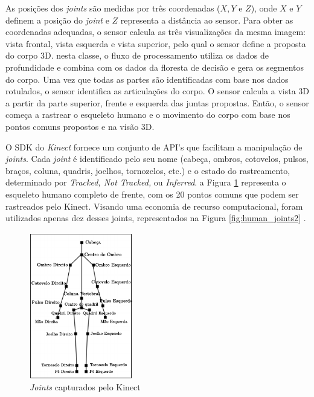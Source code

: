 As posições dos \textit{joints} são medidas por três coordenadas ($X, Y$ e $Z$), onde $X$ e $Y$ definem a posição do \textit{joint} e $Z$ representa a distância ao sensor. Para obter as coordenadas adequadas, o sensor calcula as três visualizações da mesma imagem: vista frontal, vista esquerda e vista superior, pelo qual o sensor define a proposta do corpo 3D. nesta classe, o fluxo de processamento  utiliza os dados de profundidade e combina com os dados da floresta de decisão e gera os segmentos do corpo. Uma vez que todas as partes são identificadas com base nos dados rotulados, o sensor identifica as articulações do corpo. O sensor calcula a vista 3D a partir da parte superior, frente e esquerda das juntas propostas. Então, o sensor começa a rastrear o esqueleto humano e o movimento do corpo com base nos pontos comuns propostos e na visão 3D.

O SDK do \textit{Kinect} fornece um conjunto de API's que facilitam a manipulação de \textit{joints}. Cada \textit{joint} é identificado pelo seu nome (cabeça, ombros, cotovelos, pulsos, braços, coluna, quadris, joelhos, tornozelos, etc.) e o estado do rastreamento, determinado por \textit{Tracked, Not Tracked,} ou \textit{Inferred}. a Figura \ref{fig:human_joints} representa o esqueleto humano completo de frente, com os 20 pontos comuns que podem ser rastreados pelo Kinect. Visando uma economia de recurso computacional, foram utilizados apenas dez desses joints, representados na Figura  \ref{fig:human_joints2} .


\begin{figure}[ht]
\centering
\includegraphics[width=0.4\textwidth]{images/human_joints.png}
\caption{\textit{Joints} capturados pelo Kinect}
\label{fig:human_joints}
\end{figure}

